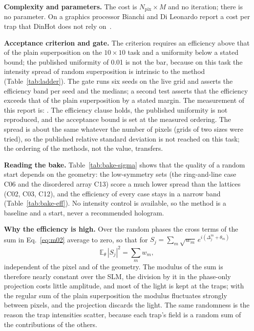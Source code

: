 \textbf{Complexity and parameters.} The cost is $N_{\mathrm{pix}}\times M$ and no iteration; there is no parameter. On a graphics processor Bianchi and Di Leonardo report a cost per trap that DinHot does not rely on~\cite{bianchi2010}.

\textbf{Acceptance criterion and gate.} The criterion requires an efficiency above that of the plain superposition on the $10\times10$ task and a uniformity below a stated bound; the published uniformity of 0.01 is not the bar, because on this task the intensity spread of random superposition is intrinsic to the method (Table~\ref{tab:ladder}). The gate runs six seeds on the live grid and asserts the efficiency band per seed and the medians; a second test asserts that the efficiency exceeds that of the plain superposition by a stated margin. The measurement of this report is: . The efficiency clause holds, the published uniformity is not reproduced, and the acceptance bound is set at the measured ordering. The spread is about the same whatever the number of pixels (grids of two sizes were tried), so the published relative standard deviation is not reached on this task; the ordering of the methods, not the value, transfers.

\textbf{Reading the bake.} Table~\ref{tab:bake-sigma} shows that the quality of a random start depends on the geometry: the low-symmetry sets (the ring-and-line case C06 and the disordered array C13) score a much lower spread than the lattices (C02, C03, C12), and the efficiency of every case stays in a narrow band (Table~\ref{tab:bake-eff}). No intensity control is available, so the method is a baseline and a start, never a recommended hologram.

\textbf{Why the efficiency is high.} Over the random phases the cross terms of the sum in Eq.~\eqref{eq:m02} average to zero, so that for $S_j=\sum_m\sqrt{w_m}\,e^{i(\Delta_j^m+\theta_m)}$
\begin{equation}
\mathbb E_\theta\,|S_j|^2=\sum_mw_m,
\label{eq:m02-power}
\end{equation}
independent of the pixel and of the geometry. The modulus of the sum is therefore nearly constant over the SLM, the division by it in the phase-only projection costs little amplitude, and most of the light is kept at the traps; with the regular sum of the plain superposition the modulus fluctuates strongly between pixels, and the projection discards the light. The same randomness is the reason the trap intensities scatter, because each trap's field is a random sum of the contributions of the others.

